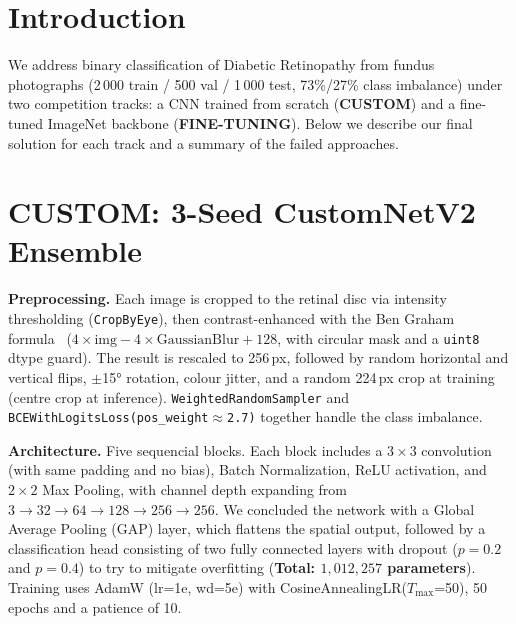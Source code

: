 \documentclass[a4paper, 10pt, twocolumn]{article}
\begin{document}

\section{Introduction}

We address binary classification of Diabetic Retinopathy from
fundus photographs (2\,000 train / 500 val / 1\,000 test, 73\%/27\%
class imbalance) under two competition tracks: a CNN trained from scratch
(\textbf{CUSTOM}) and a fine-tuned ImageNet backbone (\textbf{FINE-TUNING}).
Below we describe our final solution for each track and a summary of the failed approaches.

\section{CUSTOM: 3-Seed CustomNetV2 Ensemble}


\textbf{Preprocessing.}
Each image is cropped to the retinal disc via intensity thresholding
(\texttt{CropByEye}), then contrast-enhanced with the Ben Graham
formula~\cite{graham2015kaggle}
($4{\times}\text{img}-4{\times}\text{GaussianBlur}+128$, with circular
mask and a \texttt{uint8} dtype guard). The result is rescaled to 256\,px, followed by random
horizontal and vertical flips, $\pm$15° rotation, colour jitter, and a
random 224\,px crop at training (centre crop at inference).
\texttt{WeightedRandomSampler} and
\texttt{BCEWithLogitsLoss(pos\_weight$\approx$2.7)} together handle
the class imbalance.

\textbf{Architecture.}
Five sequencial blocks. Each block includes a $3\times3$ convolution (with same padding and no bias), Batch Normalization, ReLU activation, and $2\times2$ Max Pooling, with channel depth expanding from
$3{\to}32{\to}64{\to}128{\to}256{\to}256$. We concluded the network with a Global Average Pooling (GAP) layer, which flattens the spatial output, followed by a classification head consisting of two fully connected layers with dropout ($p=0.2$ and $p=0.4$) to try to mitigate overfitting (\textbf{Total: $1,012,257$ parameters}).
Training uses AdamW (lr=1e, wd=5e) with
CosineAnnealingLR($T_\text{max}$=50), 50 epochs and a patience of 10.
\end{document}
